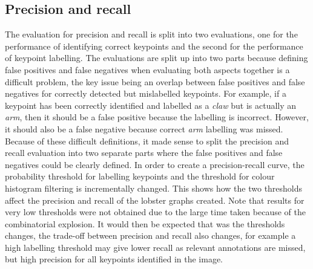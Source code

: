 \subsection{Precision and recall}
The evaluation for precision and recall is split into two evaluations, one for the performance of identifying correct keypoints and the second for the performance of keypoint labelling. The evaluations are split up into two parts because defining false positives and false negatives when evaluating both aspects together is a difficult problem, the key issue being an overlap between false positives and false negatives for correctly detected but mislabelled keypoints. For example, if a keypoint has been correctly identified and labelled as a \textit{claw} but is actually an \textit{arm}, then it should be a false positive because the labelling is incorrect. However, it should also be a false negative because correct \textit{arm} labelling was missed. Because of these difficult definitions, it made sense to split the precision and recall evaluation into two separate parts where the false positives and false negatives could be clearly defined.
\n
In order to create a precision-recall curve, the probability threshold for labelling keypoints and the threshold for colour histogram filtering is incrementally changed. This shows how the two thresholds affect the precision and recall of the lobster graphs created. Note that results for very low thresholds were not obtained due to the large time taken because of the combinatorial explosion. It would then be expected that was the thresholds changes, the trade-off between precision and recall also changes, for example a high labelling threshold may give lower recall as relevant annotations are missed, but high precision for all keypoints identified in the image.


